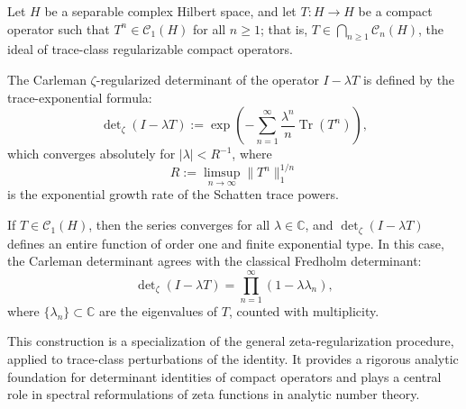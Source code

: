 \begin{definition}
\label{def:carleman-zeta-determinant}
Let \( H \) be a separable complex Hilbert space, and let \( T \colon H \to H \) be a compact operator such that \( T^n \in \mathcal{C}_1(H) \) for all \( n \ge 1 \); that is, \( T \in \bigcap_{n \ge 1} \mathcal{C}_n(H) \), the ideal of trace-class regularizable compact operators.

\medskip
\noindent
The Carleman \(\zeta\)-regularized determinant of the operator \( I - \lambda T \) is defined by the trace-exponential formula:
\[
\det\nolimits_\zeta(I - \lambda T) := \exp\left( - \sum_{n=1}^\infty \frac{\lambda^n}{n} \operatorname{Tr}(T^n) \right),
\]
which converges absolutely for \( |\lambda| < R^{-1} \), where
\[
R := \limsup_{n \to \infty} \|T^n\|_1^{1/n}
\]
is the exponential growth rate of the Schatten trace powers.

\medskip
\noindent
If \( T \in \mathcal{C}_1(H) \), then the series converges for all \( \lambda \in \mathbb{C} \), and \( \det\nolimits_\zeta(I - \lambda T) \) defines an entire function of order one and finite exponential type. In this case, the Carleman determinant agrees with the classical Fredholm determinant:
\[
\det\nolimits_\zeta(I - \lambda T)
= \prod_{n=1}^\infty (1 - \lambda \lambda_n),
\]
where \( \{ \lambda_n \} \subset \mathbb{C} \) are the eigenvalues of \( T \), counted with multiplicity.

\medskip
\noindent
This construction is a specialization of the general zeta-regularization procedure, applied to trace-class perturbations of the identity. It provides a rigorous analytic foundation for determinant identities of compact operators and plays a central role in spectral reformulations of zeta functions in analytic number theory.
\end{definition}
% 